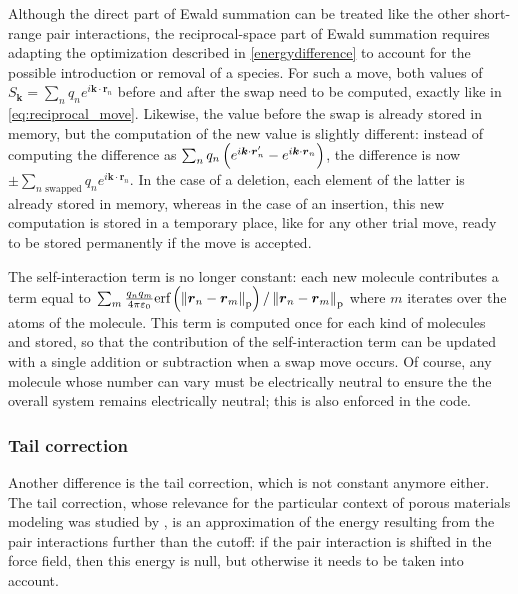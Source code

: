 \documentclass[main.tex]{subfiles}
\begin{document}
Although the direct part of Ewald summation can be treated like the other short-range pair interactions, the reciprocal-space part of Ewald summation requires adapting the optimization described in \cref{energydifference} to account for the possible introduction or removal of a species. For such a move, both values of $S_{\boldsymbol k} = \sum_n q_ne^{i\boldsymbol k\cdot\boldsymbol r_n}$ before and after the swap need to be computed, exactly like in \cref{eq:reciprocal_move}. Likewise, the value before the swap is already stored in memory, but the computation of the new value is slightly different: instead of computing the difference as $\sum_n q_n\left(e^{i\boldsymbol k\cdot\boldsymbol r'_n} - e^{i\boldsymbol k\cdot\boldsymbol r_n}\right)$, the difference is now $\pm\sum_{n\text{ swapped}} q_n e^{i\boldsymbol k\cdot\boldsymbol r_n}$. In the case of a deletion, each element of the latter is already stored in memory, whereas in the case of an insertion, this new computation is stored in a temporary place, like for any other trial move, ready to be stored permanently if the move is accepted.

The self-interaction term is no longer constant: each new molecule contributes a term equal to $\sum_m\frac{q_n q_m}{4\pi\varepsilon_0}\text{erf}\left(\left\|\boldsymbol r_n - \boldsymbol r_m\right\|_\text{p}\right)/\left\|\boldsymbol r_n - \boldsymbol r_m\right\|_\text{p}$ where $m$ iterates over the atoms of the molecule. This term is computed once for each kind of molecules and stored, so that the contribution of the self-interaction term can be updated with a single addition or subtraction when a swap move occurs. Of course, any molecule whose number can vary must be electrically neutral to ensure the the overall system remains electrically neutral; this is also enforced in the code.

\subsubsection{Tail correction}

\label{tailcorrection}

Another difference is the tail correction, which is not constant anymore either. The tail correction, whose relevance for the particular context of porous materials modeling was studied by \textcite{TailCorrection}, is an approximation of the energy resulting from the pair interactions further than the cutoff: if the pair interaction is shifted in the force field, then this energy is null, but otherwise it needs to be taken into account.
\end{document}
